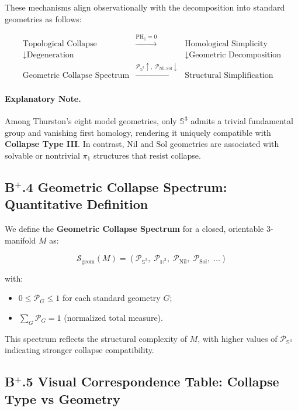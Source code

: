 \documentclass[11pt]{article}
\begin{document}
These mechanisms align observationally with the decomposition into standard geometries as follows:

\[
\begin{array}{ccc}
\text{Topological Collapse} & \xrightarrow{\mathrm{PH}_1 = 0} & \text{Homological Simplicity} \\
\downarrow \text{Degeneration} & & \downarrow \text{Geometric Decomposition} \\
\text{Geometric Collapse Spectrum} & \xrightarrow{\mathcal{P}_{\mathbb{S}^3} \uparrow,\;\mathcal{P}_{\mathrm{Nil},\mathrm{Sol}} \downarrow} & \text{Structural Simplification}
\end{array}
\]

\paragraph{Explanatory Note.}  
Among Thurston's eight model geometries, only $\mathbb{S}^3$ admits a trivial fundamental group and vanishing first homology, rendering it uniquely compatible with \textbf{Collapse Type III}. In contrast, $\mathrm{Nil}$ and $\mathrm{Sol}$ geometries are associated with solvable or nontrivial $\pi_1$ structures that resist collapse.

\subsection*{B$^{+}$.4 Geometric Collapse Spectrum: Quantitative Definition}

We define the \textbf{Geometric Collapse Spectrum} for a closed, orientable $3$-manifold $M$ as:

\[
\mathcal{S}_{\mathrm{geom}}(M) = \left( \mathcal{P}_{\mathbb{S}^3},\; \mathcal{P}_{\mathbb{H}^3},\; \mathcal{P}_{\mathrm{Nil}},\; \mathcal{P}_{\mathrm{Sol}},\; \ldots \right)
\]

with:

\begin{itemize}
    \item $0 \leq \mathcal{P}_G \leq 1$ for each standard geometry $G$;
    \item $\sum_G \mathcal{P}_G = 1$ (normalized total measure).
\end{itemize}

This spectrum reflects the structural complexity of $M$, with higher values of $\mathcal{P}_{\mathbb{S}^3}$ indicating stronger collapse compatibility.

\subsection*{B$^{+}$.5 Visual Correspondence Table: Collapse Type vs Geometry}
\end{document}
